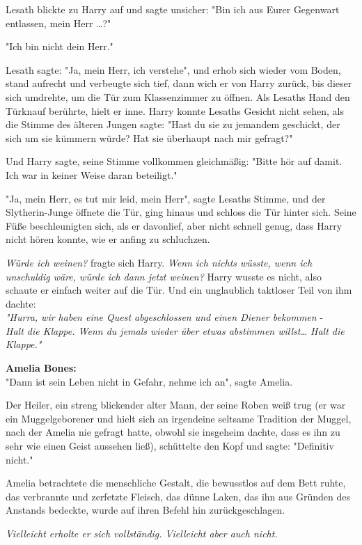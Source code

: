 {Lesath blickte zu Harry auf und sagte unsicher: "Bin ich aus Eurer Gegenwart entlassen, mein Herr …?"

"Ich bin nicht dein Herr."

Lesath sagte: "Ja, mein Herr, ich verstehe", und erhob sich wieder vom Boden, stand aufrecht und verbeugte sich tief, dann wich er von Harry zurück, bis dieser sich umdrehte, um die Tür zum Klassenzimmer zu öffnen. Als Lesaths Hand den Türknauf berührte, hielt er inne. Harry konnte Lesaths Gesicht nicht sehen, als die Stimme des älteren Jungen sagte: "Hast du sie zu jemandem geschickt, der sich um sie kümmern würde? Hat sie überhaupt nach mir gefragt?"

Und Harry sagte, seine Stimme vollkommen gleichmäßig: "Bitte hör auf damit. Ich war in keiner Weise daran beteiligt."

"Ja, mein Herr, es tut mir leid, mein Herr", sagte Lesaths Stimme, und der Slytherin-Junge öffnete die Tür, ging hinaus und schloss die Tür hinter sich. Seine Füße beschleunigten sich, als er davonlief, aber nicht schnell genug, dass Harry nicht hören konnte, wie er anfing zu schluchzen.

\emph{Würde ich weinen?} fragte sich Harry. \emph{Wenn ich nichts wüsste, wenn ich unschuldig wäre, würde ich dann jetzt weinen?} Harry wusste es nicht, also schaute er einfach weiter auf die Tür. Und ein unglaublich taktloser Teil von ihm dachte:\\ \emph{"Hurra, wir haben eine Quest abgeschlossen und einen Diener bekommen} -\\ \emph{Halt die Klappe. Wenn du jemals wieder über etwas abstimmen willst… Halt die Klappe."}

\textbf{Amelia Bones:}\\ "Dann ist sein Leben nicht in Gefahr, nehme ich an", sagte Amelia.

Der Heiler, ein streng blickender alter Mann, der seine Roben weiß trug (er war ein Muggelgeborener und hielt sich an irgendeine seltsame Tradition der Muggel, nach der Amelia nie gefragt hatte, obwohl sie insgeheim dachte, dass es ihn zu sehr wie einen Geist aussehen ließ), schüttelte den Kopf und sagte: "Definitiv nicht."

Amelia betrachtete die menschliche Gestalt, die bewusstlos auf dem Bett ruhte, das verbrannte und zerfetzte Fleisch, das dünne Laken, das ihn aus Gründen des Anstands bedeckte, wurde auf ihren Befehl hin zurückgeschlagen.

\emph{Vielleicht erholte er sich vollständig. Vielleicht aber auch nicht.}

}
